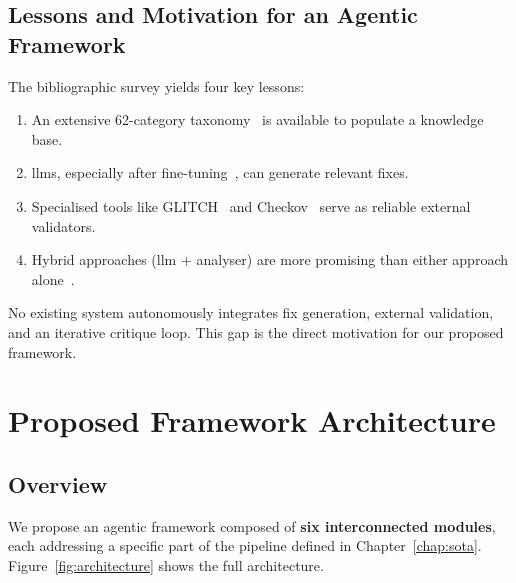 \documentclass[12pt, a4paper]{report}
\begin{document}
\section{Lessons and Motivation for an Agentic Framework}

The bibliographic survey yields four key lessons:

\begin{enumerate}
  \item An extensive 62-category taxonomy~\citep{war2025taxonomy} is available to
  populate a knowledge base.
  \item \gls{llm}s, especially after fine-tuning~\citep{li2025gensiac}, can generate
  relevant fixes.
  \item Specialised tools like GLITCH~\citep{saavedra2022glitch} and
  Checkov~\citep{checkov2024} serve as reliable external validators.
  \item Hybrid approaches (\gls{llm} + analyser) are more promising than either
  approach alone~\citep{gnieciak2025llmvsstatic}.
\end{enumerate}

\begin{researchbox}
No existing system autonomously integrates fix generation, external validation,
and an iterative critique loop. This gap is the direct motivation for our
proposed framework.
\end{researchbox}

\chapter{Proposed Framework Architecture}
\label{chap:architecture}

\section{Overview}

We propose an agentic framework composed of \textbf{six interconnected modules},
each addressing a specific part of the pipeline defined in Chapter~\ref{chap:sota}.
Figure~\ref{fig:architecture} shows the full architecture.
\end{document}
